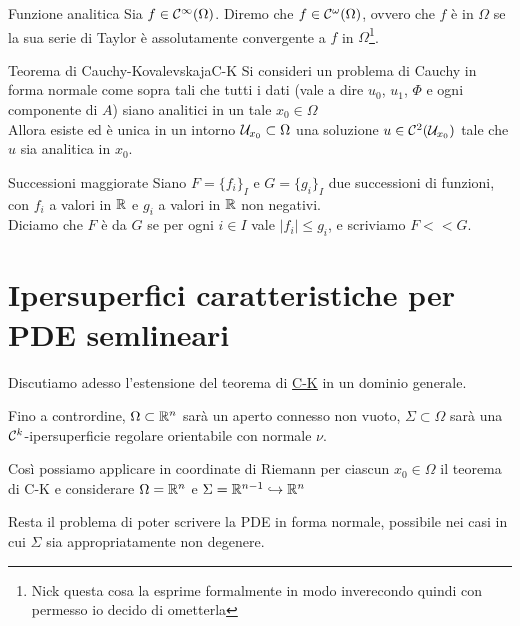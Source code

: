 \documentclass{article}
\begin{document}
\begin{definition}{Funzione analitica}{}
    Sia $f \in \mathcal{C}^\infty(\Omega)$. Diremo che $f\in\mathcal{C}^\omega(\Omega)$, ovvero che $f$ è  in $\Omega$ se la sua serie di Taylor è assolutamente convergente a $f$ in $\Omega$\footnote{Nick questa cosa la esprime formalmente in modo inverecondo quindi con permesso io decido di ometterla}.
\end{definition}

\begin{theorem}{Teorema di Cauchy-Kovalevskaja}{C-K}
    Si consideri un problema di Cauchy in forma normale come sopra tali che tutti i dati (vale a dire $u_0$, $u_1$, $\Phi$ e ogni componente di $A$) siano analitici in un tale $x_0 \in \Omega$\\
    Allora esiste ed è unica in un intorno $\mathcal{U}_{x_0} \subset \Omega$ una soluzione $u\in\mathcal{C}^2(\mathcal{U}_{x_0})$ tale che $u$ sia analitica in $x_0$.
\end{theorem}

\begin{definition}{Successioni maggiorate}{}
    Siano $F = \{f_i\}_I$ e $G = \{g_i\}_I$ due successioni di funzioni, con $f_i$ a valori in $\mathbb{R}$ e $g_i$ a valori in $\mathbb{R}$ non negativi.\\
    Diciamo che $F$ è  da $G$ se per ogni $i\in I$ vale $|f_i| \le g_i$, e scriviamo $F<<G$.
\end{definition}

\section{Ipersuperfici caratteristiche per PDE semlineari}

Discutiamo adesso l'estensione del teorema di \href{th:C-K}{C-K} in un dominio generale.

\begin{notation}
    Fino a contrordine, $\Omega \subset \mathbb{R}^n$ sarà un aperto connesso non vuoto, $\Sigma\subset\Omega$ sarà una $\mathcal{C}^k$-ipersuperficie regolare orientabile con normale $\nu$.
\end{notation}

Così possiamo applicare in coordinate di Riemann per ciascun $x_0 \in \Omega$ il teorema di C-K e considerare $\Omega = \mathbb{R}^n$ e $\Sigma = \mathbb{R}^{n-1}\hookrightarrow\mathbb{R}^n$

Resta il problema di poter scrivere la PDE in forma normale, possibile nei casi in cui $\Sigma$ sia appropriatamente non degenere.
\end{document}

